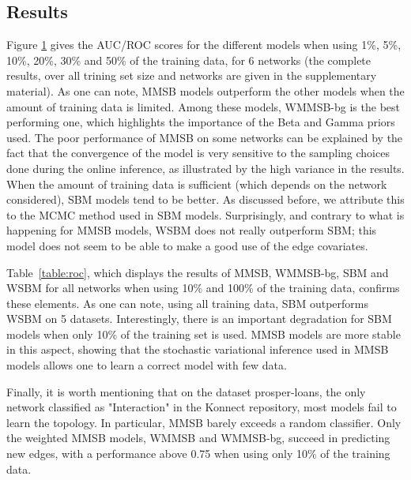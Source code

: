 \begin{figure}[h]
\centering
	
   \label{fig:roc}
\end{figure}

\subsection{Results}
Figure \ref{fig:roc} gives the AUC/ROC scores for the different models when using 1\%, 5\%, 10\%, 20\%, 30\% and 50\% of the training data, for 6 networks (the complete results, over all trining set size and networks are given in the supplementary material). As one can note, MMSB models outperform the other models when the amount of training data is limited. Among these models, WMMSB-bg is the best performing one, which highlights the importance of the Beta and Gamma priors used. The poor performance of MMSB on some networks can be explained by the fact that the convergence of the model is very sensitive to the sampling choices done during the online inference, as illustrated by the high variance in the results. When the amount of training data is sufficient (which depends on the network considered), SBM models tend to be better. As discussed before, we attribute this to the MCMC method used in SBM models. Surprisingly, and contrary to what is happening for MMSB models, WSBM does not really outperform SBM; this model does not seem to be able to make a good use of the edge covariates. 

Table~\ref{table:roc}, which displays the results of MMSB, WMMSB-bg, SBM and WSBM for all networks when using 10\% and 100\% of the training data, confirms these elements. As one can note, using all training data, SBM outperforms WSBM on 5 datasets. Interestingly, there is an important degradation for SBM models when only 10\% of the training set is used. MMSB models are more stable in this aspect, showing that the stochastic variational inference used in MMSB models allows one to learn a correct model with few data.

Finally, it is worth mentioning that on the dataset prosper-loans, the only network classified as "Interaction" in the Konnect repository, most models fail to learn the topology. In particular, MMSB barely exceeds a random classifier. Only the weighted MMSB models, WMMSB and WMMSB-bg, succeed in predicting new edges, with a performance above 0.75 when using only 10\% of the training data.
 
